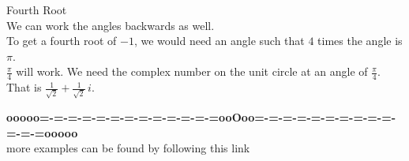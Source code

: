 \documentclass{ximera}
\begin{document}
\begin{example}  Fourth Root \\


We can work the angles backwards as well.  \\

To get a fourth root of $-1$, we would need an angle such that $4$ times the angle is $\pi$.    \\

$\frac{\pi}{4}$ will work.  We need the complex number on the unit circle at an angle of $\frac{\pi}{4}$.  That is $\frac{1}{\sqrt{2}} + \frac{1}{\sqrt{2}} \, i$.


\end{example}













\begin{center}
\textbf{\textcolor{green!50!black}{ooooo=-=-=-=-=-=-=-=-=-=-=-=-=ooOoo=-=-=-=-=-=-=-=-=-=-=-=-=ooooo}} \\

more examples can be found by following this link\\ 

\end{center}
\end{document}

